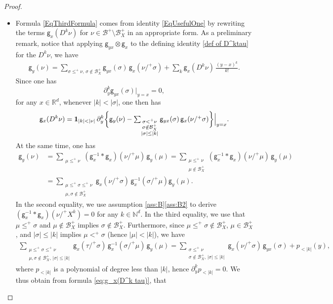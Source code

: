 \documentclass[JEP,XML,SOM,Unicode,published]{cedram}
\theoremstyle{plain}
\theoremstyle{definition}
\newcommand{\unit}{\mathbf{1}}
\newcommand{\sfg}{\mathsf{g}}
\newcommand{\bbN}{\mathbb{N}}
\newcommand{\bbR}{\mathbb{R}}
\newcommand{\mcB}{\mathcal{B}}
\begin{document}
\begin{proof}
\begin{itemize}
\item
Formula \eqref{EqThirdFormula} comes from identity \eqref{EqUsefulOne} by rewriting the terms ${\sfg}_x(D^k\nu)$ for $\nu\in\mcB^+\setminus\mcB_X^+$ in an appropriate form. As a preliminary remark, notice that applying $\sfg_{yx}\otimes\sfg_x$ to the defining identity \eqref{def of D^ktau} for the $D^k\nu$, we have
\begin{align*}
\sfg_y(\nu) = \sum_{\sigma\leq^+\nu,\, \sigma\notin\mcB_X^+} \sfg_{yx}(\sigma)\,\sfg_x(\nu/^+\sigma) + \sum_k\sfg_x(D^k\nu)\,\frac{(y-x)^k}{k!}.
\end{align*}
Since one has
\[
\partial_y^k\sfg_{yx}(\sigma)\big|_{y=x} = 0,
\]
for any $x\in\bbR^d$, whenever $|k| < |\sigma|$, one then has
\begin{align}\label{eq:g_x(D^k tau)}
{\sf g}_x(D^k\nu) = \unit_{|k|<|\nu|}\, \partial_y^k\bigg\{\sfg_y(\nu) - \textstyle\sum_{\substack{\sigma<^+\nu\\\sigma\notin\mcB_X^+\\|\sigma| \leq |k|}} \sfg_{yx}(\sigma)\,\sfg_x(\nu/^+\sigma)\bigg\}\Big|_{y=x}.
\end{align}
At the same time, one has
\begin{align*}
\sfg_y(\nu) &= \sum_{\substack{\mu\le^+\nu}} (\sfg_x^{-1}*\sfg_x)(\nu/^+\mu)\,\sfg_y(\mu) = \sum_{\substack{\mu\le^+\nu \\ \mu\notin\mcB_X^+}} (\sfg_x^{-1}*\sfg_x)(\nu/^+\mu)\,\sfg_y(\mu) \\
&= \sum_{\substack{\mu\le^+\sigma\le^+\nu \\ \mu,\sigma\notin\mcB_X^+}} \sfg_x(\nu/^+\sigma)\,\sfg_x^{-1}(\sigma/^+\mu)\sfg_y(\mu).
\end{align*}
In the second equality, we use assumption \ref{ass:B}\eqref{ass:B2} to derive $(\sfg_x^{-1}*\sfg_x)(\nu/^+X^k)=0$ for any $k\in\bbN^d$.
In the third equality, we use that $\mu\le^+\sigma$ and $\mu\notin\mcB_X^+$ implies $\sigma\notin\mcB_X^+$. Furthermore, since $\mu\le^+\sigma\notin\mcB_X^+$, $\mu\in\mcB_X^+$, and $|\sigma|\le |k|$ implies $\mu<^+\sigma$ (hence $|\mu|<|k|$), we have
\begin{align*}
\sum_{\substack{\mu\le^+\sigma\le^+\nu \\ \mu,\sigma\notin\mcB_X^+,\,|\sigma|\le|k|}} \sfg_x(\tau/^+\sigma)\,\sfg_x^{-1}(\sigma/^+\mu)\,\sfg_y(\mu) = \sum_{\substack{\sigma\le^+\nu \\ \sigma\notin\mcB_X^+,\,|\sigma|\le|k|}} \sfg_x(\nu/^+\sigma)\,\sfg_{yx}(\sigma)+p_{<|k|}(y),
\end{align*}
where $p_{<|k|}$ is a polynomial of degree less than $|k|$, hence $\partial^k_yp_{<|k|}=0$. We thus obtain from formula \eqref{eq:g_x(D^k tau)}, that

\end{itemize}
\end{proof}
\end{document}
